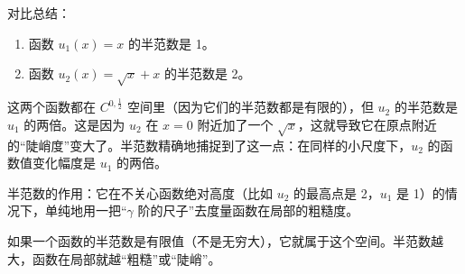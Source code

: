 \documentclass[../../main.tex]{subfiles}
\begin{document}
\begin{remark}
对比总结：
\begin{enumerate}[(1)]
\item 函数 \(u_1(x) = x\) 的半范数是 1。
\item 函数 \(u_2(x) = \sqrt{x} + x\) 的半范数是 2。
\end{enumerate}
这两个函数都在 \(C^{0, \frac{1}{2}}\) 空间里（因为它们的半范数都是有限的），但 \(u_2\) 的半范数是 \(u_1\) 的两倍。这是因为 \(u_2\) 在 \(x=0\) 附近加了一个 \(\sqrt{x}\)，这就导致它在原点附近的“陡峭度”变大了。半范数精确地捕捉到了这一点：在同样的小尺度下，\(u_2\) 的函数值变化幅度是 \(u_1\) 的两倍。

半范数的作用：它在不关心函数绝对高度（比如 \(u_2\) 的最高点是 2，\(u_1\) 是 1）的情况下，单纯地用一把“\(\gamma\) 阶的尺子”去度量函数在局部的粗糙度。

如果一个函数的半范数是有限值（不是无穷大），它就属于这个空间。半范数越大，函数在局部就越“粗糙”或“陡峭”。
\end{remark}
\end{document}

